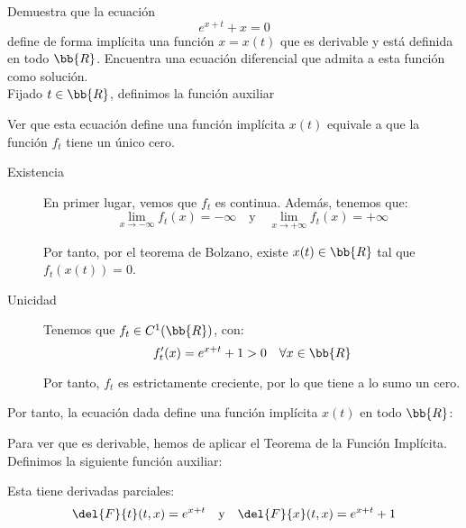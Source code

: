 \documentclass[12pt]{article}
\begin{document}
    \begin{ejercicio}
        Demuestra que la ecuación
        \begin{equation*}
            e^{x+t} + x = 0
        \end{equation*}
        define de forma implícita una función $x = x(t)$ que es derivable y está definida en todo $\bb{R}$. Encuentra una ecuación diferencial que admita a esta función como solución.\\

        Fijado $t\in \bb{R}$, definimos la función auxiliar

        Ver que esta ecuación define una función implícita $x(t)$ equivale a que la función $f_t$ tiene un único cero.
        \begin{description}
            \item[Existencia] En primer lugar, vemos que $f_t$ es continua. Además, tenemos que:
            \begin{equation*}
                \lim_{x\to-\infty} f_t(x) = -\infty \quad \text{y} \quad \lim_{x\to+\infty} f_t(x) = +\infty
            \end{equation*}

            Por tanto, por el teorema de Bolzano, existe $x(t)\in \bb{R}$ tal que $f_t(x(t)) = 0$.

            \item[Unicidad] Tenemos que $f_t\in C^1(\bb{R})$, con:
            \begin{equation*}
                f_t'(x) = e^{x+t} + 1 > 0 \quad \forall x\in\bb{R}
            \end{equation*}

            Por tanto, $f_t$ es estrictamente creciente, por lo que tiene a lo sumo un cero.
        \end{description}

        Por tanto, la ecuación dada define una función implícita $x(t)$ en todo $\bb{R}$:

        Para ver que es derivable, hemos de aplicar el Teorema de la Función Implícita. Definimos la siguiente función auxiliar:

        Esta tiene derivadas parciales:
        \begin{equation*}
            \del{F}{t}(t,x) = e^{x+t} \quad \text{y} \quad \del{F}{x}(t,x) = e^{x+t} + 1
        \end{equation*}
        

\end{ejercicio}
\end{document}
